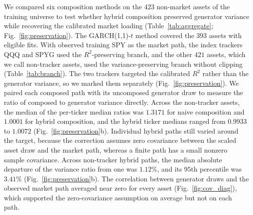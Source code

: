 We compared six composition methods on the $423$ non-market assets of
the training universe to test whether hybrid composition preserved
generator variance while recovering the calibrated market loading
(Table~\ref{tab:aggregate}; Fig.~\ref{fig:preservation}). The
GARCH(1,1)-$t$ method covered the $393$ assets with eligible fits.
With observed training SPY as the market path, the index trackers QQQ
and SPYG used the $R^2$-preserving branch, and the other $421$ assets,
which we call non-tracker assets, used the variance-preserving branch
without clipping (Table~\ref{tab:branch}). The two trackers targeted
the calibrated $R^2$ rather than the generator variance, so we marked
them separately (Fig.~\ref{fig:preservation}). We paired each composed
path with its uncomposed generator draw to measure the ratio of
composed to generator variance directly. Across the non-tracker
assets, the median of the per-ticker median ratios was $1.3171$ for
naive composition and $1.0001$ for hybrid composition, and the hybrid
ticker medians ranged from $0.9933$ to $1.0072$
(Fig.~\ref{fig:preservation}b). Individual hybrid paths still varied
around the target, because the correction assumes zero covariance
between the scaled asset draw and the market path, whereas a finite
path has a small nonzero sample covariance. Across non-tracker hybrid
paths, the median absolute departure of the variance ratio from one
was $1.12\%$, and its $95$th percentile was $3.41\%$
(Fig.~\ref{fig:preservation}b). The correlation between generator
draws and the observed market path averaged near zero for every asset
(Fig.~\ref{fig:cov_diag}), which supported the zero-covariance
assumption on average but not on each path.



